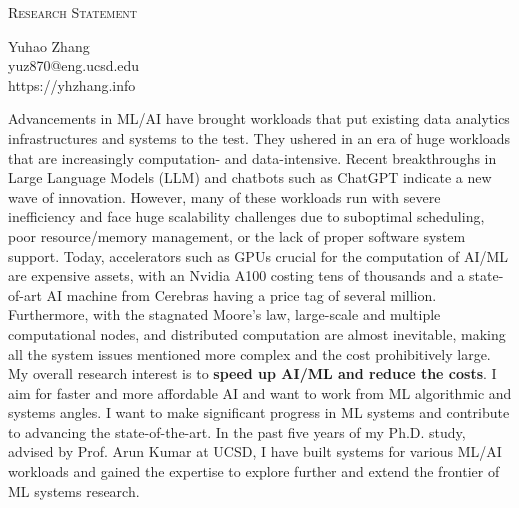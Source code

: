 \documentclass[letterpaper]{article}
\makeatletter
\newcommand{\soptitle}{Research Statement}
\newcommand{\yourname}{Yuhao Zhang}
\newcommand{\youremail}{yuz870@eng.ucsd.edu}
\newcommand{\amper}{{\fontspec[Scale=1]{Adobe Caslon Pro}\selectfont\itshape\&~{}}}
\makeatother
\begin{document}
\begin{center}{\huge \scshape \soptitle}\end{center}
\begin{center}\vspace{0.2em} {\Large \yourname\\}
  {\youremail\\} {https://yhzhang.info}\end{center}

\noindent Advancements in ML/AI have brought workloads that put existing data analytics infrastructures and systems to the test. They ushered in an era of huge workloads that are increasingly computation- and data-intensive. Recent breakthroughs in Large Language Models (LLM) and chatbots such as ChatGPT indicate a new wave of innovation. However, many of these workloads run with severe inefficiency and face huge scalability challenges due to suboptimal scheduling, poor resource/memory management, or the lack of proper software system support. Today, accelerators such as GPUs crucial for the computation of AI/ML are expensive assets, with an Nvidia A100 costing tens of thousands and a state-of-art AI machine from Cerebras having a price tag of several million. Furthermore, with the stagnated Moore's law, large-scale and multiple computational nodes, and distributed computation are almost inevitable, making all the system issues mentioned more complex and the cost prohibitively large. My overall research interest is to \textbf{speed up AI/ML and reduce the costs}. I aim for faster and more affordable AI and want to work from ML algorithmic and systems angles. I want to make significant progress in ML systems and contribute to advancing the state-of-the-art. In the past five years of my Ph.D. study, advised by Prof. Arun Kumar at UCSD, I have built systems for various ML/AI workloads and gained the expertise to explore further and extend the frontier of ML systems research.
\end{document}
